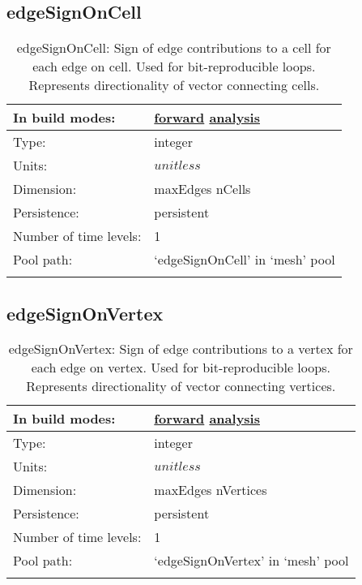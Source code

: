 \subsection[edgeSignOnCell]{edgeSignOnCell}
\label{subsec:var_sec_mesh_edgeSignOnCell}
\begin{center}
\begin{longtable}{| p{2.0in} | p{4.0in} |}
        \hline 
        In build modes: & \hyperref[subsec:forward_var_tab_mesh]{forward} \hyperref[subsec:analysis_var_tab_mesh]{analysis} \\
        \hline 
        Type: & integer \\
        \hline 
        Units: & $unitless$ \\
        \hline 
        Dimension: & maxEdges nCells \\
        \hline 
        Persistence: & persistent \\
        \hline 
        Number of time levels: & 1 \\
        \hline 
            Pool path: & `edgeSignOnCell' in `mesh' pool \\
		 \hline 
    \caption{edgeSignOnCell: Sign of edge contributions to a cell for each edge on cell. Used for bit-reproducible loops. Represents directionality of vector connecting cells.}
\end{longtable}
\end{center}
\subsection[edgeSignOnVertex]{edgeSignOnVertex}
\label{subsec:var_sec_mesh_edgeSignOnVertex}
\begin{center}
\begin{longtable}{| p{2.0in} | p{4.0in} |}
        \hline 
        In build modes: & \hyperref[subsec:forward_var_tab_mesh]{forward} \hyperref[subsec:analysis_var_tab_mesh]{analysis} \\
        \hline 
        Type: & integer \\
        \hline 
        Units: & $unitless$ \\
        \hline 
        Dimension: & maxEdges nVertices \\
        \hline 
        Persistence: & persistent \\
        \hline 
        Number of time levels: & 1 \\
        \hline 
            Pool path: & `edgeSignOnVertex' in `mesh' pool \\
		 \hline 
    \caption{edgeSignOnVertex: Sign of edge contributions to a vertex for each edge on vertex. Used for bit-reproducible loops. Represents directionality of vector connecting vertices.}
\end{longtable}
\end{center}
